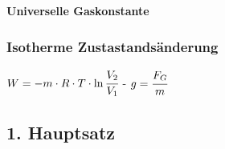 \textbf{Universelle Gaskonstante}\\
\begin{minipage}{0.45\textwidth}

\end{minipage}
\begin{minipage}{0.45\textwidth}


\end{minipage}


\subsubsection{Isotherme Zustastandsänderung}
\begin{minipage}{0.45\textwidth}


\end{minipage}
\begin{minipage}{0.45\textwidth}


\end{minipage}
$W = -m \cdot R \cdot T \cdot \ln{\cfrac{V_2}{V_1}}$ - 
$g = \cfrac{F_G}{m}$ \\

\subsection{1. Hauptsatz}
